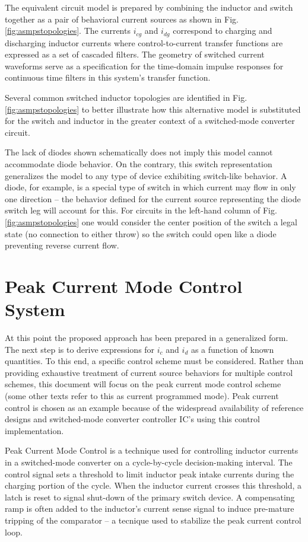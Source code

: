 \documentclass[conference]{IEEEtran}
\begin{document}
The equivalent circuit model is prepared by combining the inductor and switch together as a pair of behavioral current sources as shown in Fig. \ref{fig:asmpstopologies}. The currents $i_{cg}$ and $i_{dg}$ correspond to charging and discharging inductor currents where control-to-current transfer functions are expressed as a set of cascaded filters.  The geometry of switched current waveforms serve as a specification for the time-domain impulse responses for continuous time filters in this system's transfer function.

Several common switched inductor topologies are identified in Fig. \ref{fig:asmpstopologies} to better illustrate how this alternative model is substituted for the switch and inductor in the greater context of a switched-mode converter circuit.  

The lack of diodes shown schematically does not imply this model cannot accommodate diode behavior.  On the contrary, this switch representation generalizes the model to any type of device exhibiting switch-like behavior.  A diode, for example, is a special type of switch in which current may flow in only one direction -- the behavior defined for the current source representing the diode switch leg will account for this.  For circuits in the left-hand column of Fig. \ref{fig:asmpstopologies} one would consider the center position of the switch a legal state (no connection to either throw) so the switch could open like a diode preventing reverse current flow.

\section{Peak Current Mode Control System}
At this point the proposed approach has been prepared in a generalized form. The next step is to derive expressions for $i_c$ and $i_d$ as a function of known quantities. To this end, a specific control scheme must be considered. Rather than providing exhaustive treatment of current source behaviors for multiple control schemes, this document will focus on the peak current mode control scheme (some other texts refer to this as current programmed mode). Peak current control is chosen as an example because of the widespread availability of reference designs and switched-mode converter controller IC's using this control implementation.

Peak Current Mode Control is a technique used for controlling inductor currents in a switched-mode converter on a cycle-by-cycle decision-making interval. The control signal sets a threshold to limit inductor peak intake currents during the charging portion of the cycle. When the inductor current crosses this threshold, a latch is reset to signal shut-down of the primary switch device. A compensating ramp is often added to the inductor's current sense signal to induce pre-mature tripping of the comparator -- a tecnique used to stabilize the peak current control loop.
\end{document}
